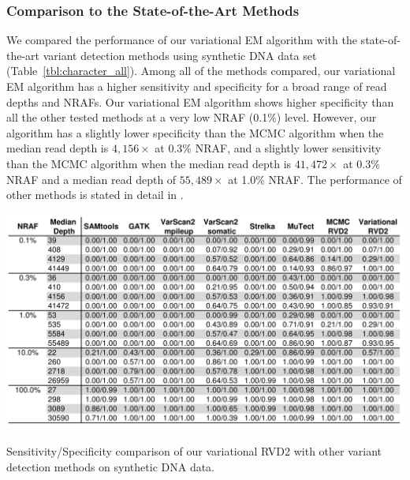 \documentclass[11pt,reqno]{amsart}
\begin{document}
\subsubsection{Comparison to the State-of-the-Art Methods}
We compared the performance of our variational EM algorithm with the state-of-the-art variant detection methods using synthetic DNA data set (Table~\ref{tbl:character_all}).
Among all of the methods compared, our variational EM algorithm has a higher sensitivity and specificity for a broad range of read depths and NRAFs.
Our variational EM algorithm shows higher specificity than all the other tested methods at a very low NRAF (0.1\%) level.
However, our algorithm has a slightly lower specificity than the MCMC algorithm when the median read depth is $4,156\times$ at 0.3\% NRAF, and a slightly lower sensitivity than the MCMC algorithm when the median read depth is $41,472\times$ at 0.3\% NRAF and a median read depth of $55,489\times$ at 1.0\% NRAF.
The performance of other methods is stated in detail in \citet{he2015rvd2}.
\begin{table}[htbp]
\centering
\includegraphics[width=1.0\textwidth]{tables/character_all.png}
\caption{Sensitivity/Specificity comparison of our variational RVD2 with other variant detection methods on synthetic DNA data.}
\label{tbl:character_all}
\end{table}
\end{document}
